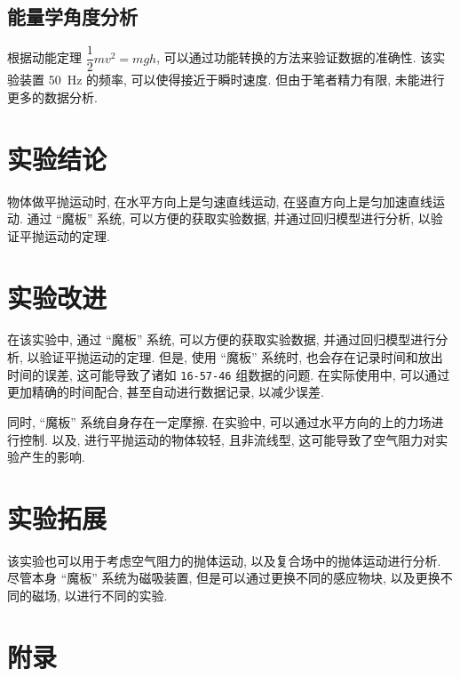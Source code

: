 \documentclass{article}
\begin{document}
\subsection{能量学角度分析}

根据动能定理 $\dfrac{1}{2}mv^2 = mgh$, 可以通过功能转换的方法来验证数据的准确性. 该实验装置 \qty{50}{\hertz} 的频率, 可以使得接近于瞬时速度. 但由于笔者精力有限, 未能进行更多的数据分析.

\section{实验结论}

物体做平抛运动时, 在水平方向上是匀速直线运动, 在竖直方向上是匀加速直线运动. 通过 ``魔板'' 系统, 可以方便的获取实验数据, 并通过回归模型进行分析, 以验证平抛运动的定理.

\section{实验改进}

在该实验中, 通过 ``魔板'' 系统, 可以方便的获取实验数据, 并通过回归模型进行分析, 以验证平抛运动的定理. 但是, 使用 ``魔板'' 系统时, 也会存在记录时间和放出时间的误差, 这可能导致了诸如 \texttt{16-57-46} 组数据的问题. 在实际使用中, 可以通过更加精确的时间配合, 甚至自动进行数据记录, 以减少误差.

同时, ``魔板'' 系统自身存在一定摩擦. 在实验中, 可以通过水平方向的上的力场进行控制. 以及, 进行平抛运动的物体较轻, 且非流线型, 这可能导致了空气阻力对实验产生的影响.

\section{实验拓展}

该实验也可以用于考虑空气阻力的抛体运动, 以及复合场中的抛体运动进行分析. 尽管本身 ``魔板'' 系统为磁吸装置, 但是可以通过更换不同的感应物块, 以及更换不同的磁场, 以进行不同的实验.

\newpage



\nocite{*}

\newpage

\section*{附录}
\end{document}
